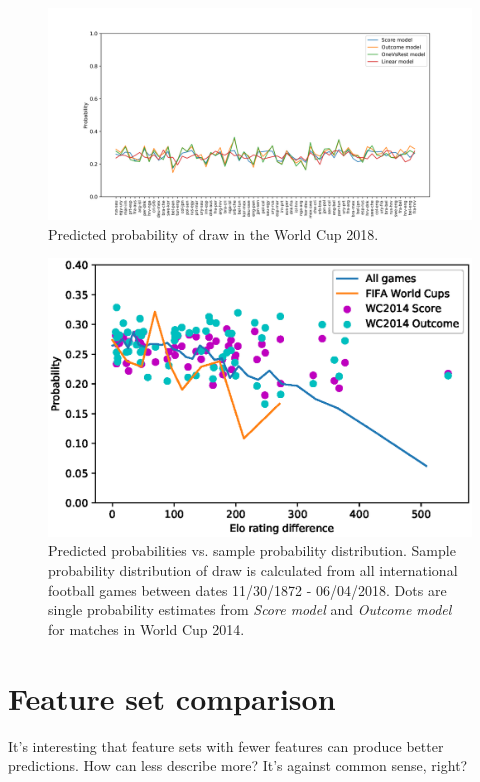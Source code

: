 \begin{figure}[H]
    \centering
    \includegraphics[width=1\textwidth]{img/match_level_2018_model_probability_draw_prob.png}
    \caption{Predicted probability of draw in the World Cup 2018.}
    \label{fig:draw_probability}
\end{figure}

\begin{figure}[H]
    \centering
    \includegraphics[width=1\textwidth]{img/draw_true_probability_wc.eps}
    \caption{Predicted probabilities vs. sample probability distribution. Sample probability distribution of draw is calculated from all international football games between dates 11/30/1872 - 06/04/2018. Dots are single probability estimates from \textit{Score model} and \textit{Outcome model} for matches in World Cup 2014.}
    \label{fig:draw_prob_dist}
\end{figure}

\section{Feature set comparison}
It's interesting that feature sets with fewer features can produce better predictions. How can less describe more? It's against common sense, right?

